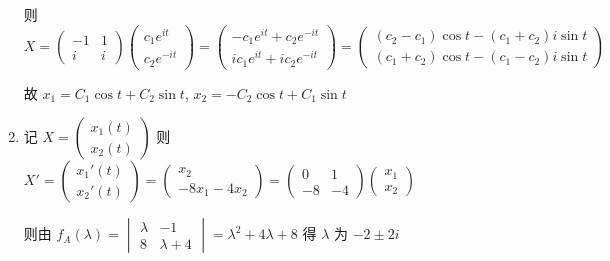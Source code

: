 \begin{enumerate}
			       则 \( X = \begin{pmatrix}
				       -1 & 1 \\
				       i  & i
			       \end{pmatrix}\begin{pmatrix}
				       c_{1}e^{it} \\
				       c_{2}e^{-it}
			       \end{pmatrix} = \begin{pmatrix}
				       -c_{1}e^{it} + c_{2}e^{-it} \\
				       ic_{1}e^{it} + ic_{2}e^{-it}
			       \end{pmatrix} = \begin{pmatrix}
				       (c_{2}-c_{1})\cos t - (c_{1}+c_{2})i\sin t \\
				       (c_{1}+c_{2})\cos t - (c_{1}-c_{2})i\sin t
			       \end{pmatrix} \)

			       故 \( x_{1} = C_{1}\cos t + C_{2}\sin t \), \( x_{2} = -C_{2}\cos t + C_{1}\sin t \)
			 \item %
			       记 \( X = \begin{pmatrix}
				       x_{1}(t) \\
				       x_{2}(t)
			       \end{pmatrix} \) 则 \( X' = \begin{pmatrix}
				       x_{1}'(t) \\
				       x_{2}'(t)
			       \end{pmatrix} = \begin{pmatrix}
				       x_{2} \\
				       -8x_{1} - 4x_{2}
			       \end{pmatrix} = \begin{pmatrix}
				       0  & 1  \\
				       -8 & -4
			       \end{pmatrix}\begin{pmatrix}
				       x_{1} \\
				       x_{2}
			       \end{pmatrix} \)

			       则由 \( f_{A}(\lambda) = \begin{vmatrix}
				       \lambda & -1        \\
				       8       & \lambda+4
			       \end{vmatrix} = \lambda^{2} + 4\lambda + 8 \) 得 \( \lambda \) 为 \( -2 \pm 2i \)


\end{enumerate}
